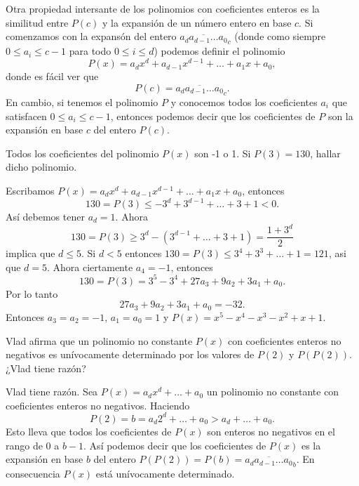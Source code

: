 Otra propiedad intersante de los polinomios con coeficientes enteros es la similitud entre $P(c)$ y la expansión de un número entero en base $c$.
Si comenzamos con la expansón del entero $\overline{a_d a_{d - 1} \ldots a_0}_c$ (donde como siempre $0 \leq a_i \leq c - 1$ para todo $0 \leq i \leq d$) podemos definir el polinomio
\[
    P(x) = a_d x^d + a_{d - 1} x^{d - 1} + \ldots + a_1 x + a_0,
\]
donde es fácil ver que
\[
    P(c) = \overline{a_d a_{d - 1} \ldots a_0}_c.
\]
En cambio, si tenemos el polinomio $P$ y conocemos todos los coeficientes $a_i$ que satisfacen $0 \leq a_i \leq c - 1$, entonces podemos decir que los coeficientes de $P$ son la expansión en base $c$ del entero $P(c)$.

\begin{example}
    Todos los coeficientes del polinomio $P(x)$ son -1 o 1.
    Si $P(3) = 130$, hallar dicho polinomio.
\end{example}
\begin{solution}
    Escribamos $P(x) = a_d x^d + a_{d - 1} x^{d - 1} + \ldots + a_1 x + a_0$, entonces
    \[
        130 = P(3) \leq - 3^d + 3^{d - 1} + \ldots + 3 + 1 < 0.
    \]
    Así debemos tener $a_d = 1$.
    Ahora
    \[
        130 = P(3) \geq 3^d - \left(3^{d - 1} + \ldots + 3 + 1\right) = \frac{1 + 3^d}{2}
    \]
    implica que $d \leq 5$.
    Si $d < 5$ entonces $130 = P(3) \leq 3^4 + 3^3 + \ldots + 1 = 121$, asi que $d = 5$.
    Ahora ciertamente $a_4 = -1$, entonces
    \[
        130 = P(3) = 3^5 - 3^4 + 27 a_3 + 9 a_2 + 3 a_1 + a_0.
    \]
    Por lo tanto
    \[
        27 a_3 + 9 a_2 + 3 a_1 + a_0 = -32.
    \]
    Entonces $a_3 = a_2 = -1$, $a_1 = a_0 = 1$ y $P(x) = x^5 - x^4 - x^3 - x^2 + x + 1$.
\end{solution}


\begin{example}
    Vlad afirma que un polinomio no constante $P(x)$ con coeficientes enteros no negativos es unívocamente determinado por los valores de $P(2)$ y $P(P(2))$.
    ¿Vlad tiene razón?
\end{example}
\begin{solution}
    Vlad tiene razón.
    Sea $P(x) = a_d x^d + \ldots + a_0$ un polinomio no constante con coeficientes enteros no negativos.
    Haciendo
    \[
        P(2) = b = a_d 2^d + \ldots + a_0 > a_d + \ldots + a_0.
    \]
    Esto lleva que todos los coeficientes de $P(x)$ son enteros no negativos en el rango de 0 a $b - 1$.
    Así podemos decir que los coeficientes de $P(x)$ es la expansión en base $b$ del entero $P(P(2)) = P(b) = \overline{a_d a_{d - 1} \ldots a_0}_b.$
    En consecuencia $P(x)$ está unívocamente determinado.
\end{solution}



